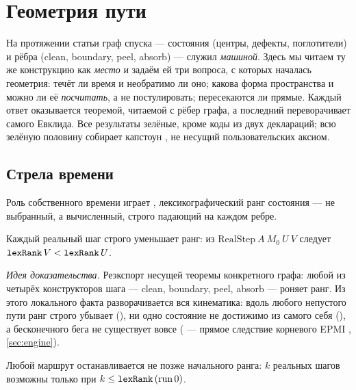 \section{Геометрия пути}\label{sec:geometry}

На протяжении статьи граф спуска  --- состояния (центры, дефекты, поглотители) и рёбра
(clean, boundary, peel, absorb) --- служил \emph{машиной}. Здесь мы читаем ту же конструкцию как
\emph{место} и задаём ей три вопроса, с которых началась геометрия: течёт ли время и необратимо ли
оно; какова форма пространства и можно ли её \emph{посчитать}, а не постулировать; пересекаются ли
прямые. Каждый ответ оказывается теоремой, читаемой с рёбер графа, а последний переворачивает самого
Евклида. Все результаты зелёные, кроме коды из двух деклараций; всю зелёную половину собирает капстоун
, не несущий пользовательских аксиом.

\subsection{Стрела времени}

Роль собственного времени играет , лексикографический ранг состояния --- не выбранный, а
вычисленный, строго падающий на каждом ребре.

\begin{theorem}\label{thm:timeArrow_step}
\green{} Каждый реальный шаг строго уменьшает ранг: из $\mathrm{RealStep}\ A\ M_0\ U\ V$ следует
$\texttt{lexRank}\,V < \texttt{lexRank}\,U$.
\end{theorem}

\emph{Идея доказательства.} Реэкспорт несущей теоремы конкретного графа: любой из четырёх
конструкторов шага --- clean, boundary, peel, absorb --- роняет ранг. Из этого локального факта
разворачивается вся кинематика: вдоль любого непустого пути ранг строго убывает
(), ни одно состояние не достижимо из самого себя (), а
бесконечного бега не существует вовсе ( --- прямое следствие корневого EPMI
, \cref{sec:engine}).

\begin{theorem}\label{thm:every_journey_halts}
\green{} Любой маршрут останавливается не позже начального ранга: $k$ реальных шагов возможны только
при $k \le \texttt{lexRank}\,(\mathrm{run}\,0)$.
\end{theorem}

